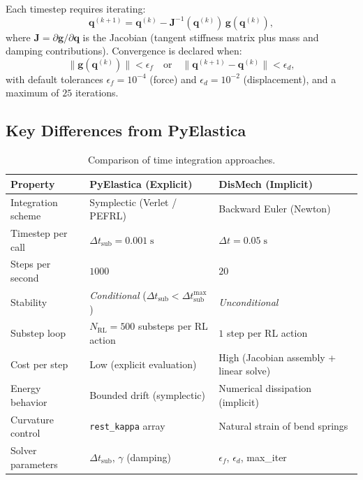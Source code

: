 \documentclass[11pt]{article}
\newcommand{\vect}[1]{\mathbf{#1}}
\newcommand{\mat}[1]{\mathbf{#1}}
\newcommand{\dtsub}{\Delta t_{\mathrm{sub}}}
\newcommand{\Nrl}{N_{\mathrm{RL}}}
\begin{document}
Each timestep requires iterating:
\begin{equation}
  \vect{q}^{(k+1)} = \vect{q}^{(k)}
    - \mat{J}^{-1}(\vect{q}^{(k)})\,\vect{g}(\vect{q}^{(k)}),
  \label{eq:newton}
\end{equation}
where $\mat{J} = \partial\vect{g}/\partial\vect{q}$ is the Jacobian
(tangent stiffness matrix plus mass and damping contributions).
Convergence is declared when:
\begin{equation}
  \|\vect{g}(\vect{q}^{(k)})\| < \epsilon_f
  \quad\text{or}\quad
  \|\vect{q}^{(k+1)} - \vect{q}^{(k)}\| < \epsilon_d,
  \label{eq:convergence}
\end{equation}
with default tolerances $\epsilon_f = 10^{-4}$ (force) and
$\epsilon_d = 10^{-2}$ (displacement), and a maximum of $25$ iterations.

\subsection{Key Differences from PyElastica}
\label{sec:comparison}

\begin{table}[H]
\centering
\caption{Comparison of time integration approaches.}
\label{tab:comparison}
\renewcommand{\arraystretch}{1.3}
\begin{tabular}{@{}lll@{}}
\toprule
\textbf{Property} & \textbf{PyElastica (Explicit)} & \textbf{DisMech (Implicit)} \\
\midrule
Integration scheme
  & Symplectic (Verlet / PEFRL)
  & Backward Euler (Newton) \\
Timestep per call
  & $\dtsub = 0.001\;\mathrm{s}$
  & $\Delta t = 0.05\;\mathrm{s}$ \\
Steps per second
  & $1000$
  & $20$ \\
Stability
  & \emph{Conditional} ($\dtsub < \dtsub^{\max}$)
  & \emph{Unconditional} \\
Substep loop
  & $\Nrl = 500$ substeps per RL action
  & $1$ step per RL action \\
Cost per step
  & Low (explicit evaluation)
  & High (Jacobian assembly + linear solve) \\
Energy behavior
  & Bounded drift (symplectic)
  & Numerical dissipation (implicit) \\
Curvature control
  & \texttt{rest\_kappa} array
  & Natural strain of bend springs \\
Solver parameters
  & $\dtsub$, $\gamma$ (damping)
  & $\epsilon_f$, $\epsilon_d$, max\_iter \\
\bottomrule
\end{tabular}
\end{table}
\end{document}
